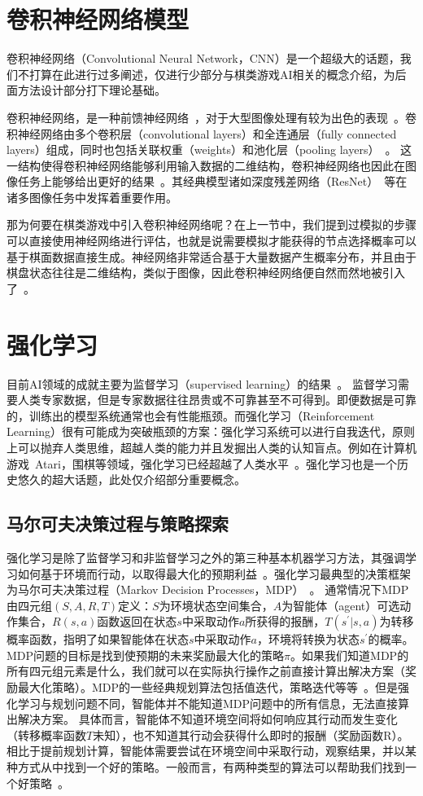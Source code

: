 \section{卷积神经网络模型}
卷积神经网络（Convolutional Neural Network，CNN）是一个超级大的话题，我们不打算在此进行过多阐述，仅进行少部分与棋类游戏AI相关的概念介绍，为后面方法设计部分打下理论基础。

卷积神经网络，是一种前馈神经网络~\cite{SCHMIDHUBER201585}，对于大型图像处理有较为出色的表现~\cite{NIPS2012_4824}。卷积神经网络由多个卷积层（convolutional layers）和全连通层（fully connected layers）组成，同时也包括关联权重（weights）和池化层（pooling layers）~\cite{venkatesan2017convolutional}。
这一结构使得卷积神经网络能够利用输入数据的二维结构，卷积神经网络也因此在图像任务上能够给出更好的结果~\cite{VALUEVA2020232}。其经典模型诸如深度残差网络（ResNet）~\cite{resnet}等在诸多图像任务中发挥着重要作用。

那为何要在棋类游戏中引入卷积神经网络呢？在上一节中，我们提到过模拟的步骤可以直接使用神经网络进行评估，也就是说需要模拟才能获得的节点选择概率可以基于棋面数据直接生成。神经网络非常适合基于大量数据产生概率分布，并且由于棋盘状态往往是二维结构，类似于图像，因此卷积神经网络便自然而然地被引入了~\cite{Silver1140,Silver2017,Silver2016}。

\section{强化学习}
目前AI领域的成就主要为监督学习（supervised learning）的结果~\cite{NIPS2012_4824,resnet,hastie2009elements,lecun2015deep}。
监督学习需要人类专家数据，但是专家数据往往昂贵或不可靠甚至不可得到。即便数据是可靠的，训练出的模型系统通常也会有性能瓶颈。而强化学习（Reinforcement Learning）很有可能成为突破瓶颈的方案：强化学习系统可以进行自我迭代，原则上可以抛弃人类思维，超越人类的能力并且发掘出人类的认知盲点。例如在计算机游戏~Atari，围棋等领域，强化学习已经超越了人类水平~\cite{Silver2016}。强化学习也是一个历史悠久的超大话题，此处仅介绍部分重要概念。
\subsection{马尔可夫决策过程与策略探索}
强化学习是除了监督学习和非监督学习之外的第三种基本机器学习方法，其强调学习如何基于环境而行动，以取得最大化的预期利益~\cite{Sutton1998}。强化学习最典型的决策框架为马尔可夫决策过程（Markov Decision Processes，MDP）~\cite{Bel}。
通常情况下MDP由四元组$(S,A,R,T)$定义：$S$为环境状态空间集合，$A$为智能体（agent）可选动作集合，$R(s,a)$函数返回在状态$s$中采取动作$a$所获得的报酬，$T(s^{\prime}|s,a)$为转移概率函数，指明了如果智能体在状态$s$中采取动作$a$，环境将转换为状态$s^{\prime}$的概率。
MDP问题的目标是找到使预期的未来奖励最大化的策略$\pi$。如果我们知道MDP的所有四元组元素是什么，我们就可以在实际执行操作之前直接计算出解决方案（奖励最大化策略）。MDP的一些经典规划算法包括值迭代，策略迭代等等~\cite{Sutton1998}。但是强化学习与规划问题不同，智能体并不能知道MDP问题中的所有信息，无法直接算出解决方案。
具体而言，智能体不知道环境空间将如何响应其行动而发生变化（转移概率函数$T$未知），也不知道其行动会获得什么即时的报酬（奖励函数R）。相比于提前规划计算，智能体需要尝试在环境空间中采取行动，观察结果，并以某种方式从中找到一个好的策略。一般而言，有两种类型的算法可以帮助我们找到一个好策略~\cite{rlbase}。

